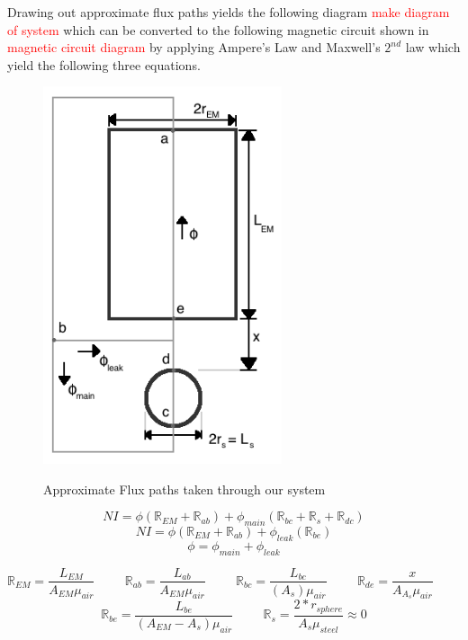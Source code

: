 \documentclass{article}
\newcommand{\xxx}[1]{\textcolor{red}{#1}}
\theoremstyle{plain}
\theoremstyle{definition}
\theoremstyle{remark}
\begin{document}
Drawing out approximate flux paths yields the following diagram \xxx{make diagram of system} which can be converted to the following magnetic circuit shown in \xxx{magnetic circuit diagram} by applying Ampere's Law and Maxwell's $2^{nd}$ law which yield the following three equations.  \\

\begin{figure}
\includegraphics[width = 7cm]{flux_diagram.png}
\label{Q1_a2}
\caption{Approximate Flux paths taken through our system}
\end{figure}

$$ NI = \phi \left (\mathbb{R}_{EM} + \mathbb{R}_{ab}\right) + \phi_{main} \left( \mathbb{R}_{bc}+\mathbb{R}_{s}+\mathbb{R}_{dc} \right) $$
$$ NI = \phi \left( \mathbb{R}_{EM} + \mathbb{R}_{ab} \right) + \phi_{leak} \left( \mathbb{R}_{be} \right) $$
$$ \phi = \phi_{main} + \phi_{leak} $$


$$ \mathbb{R}_{EM} = \frac{L_{EM}}{A_{EM}\mu_{air}}  \hspace{1cm} \mathbb{R}_{ab} = \frac{L_{ab}}{A_{EM}\mu_{air}} \hspace{1cm} \mathbb{R}_{bc} = \frac{L_{bc}}{(A_{s})\mu_{air}} \hspace{1cm} \mathbb{R}_{de} = \frac{x}{A_{A_{s}}\mu_{air}} \hspace{1cm} $$ $$ \mathbb{R}_{be} = \frac{L_{be}}{(A_{EM} - A_{s})\mu_{air}}  \hspace{1cm}  \mathbb{R}_{s} = \frac{2*r_{sphere}}{A_{s}\mu_{steel}} \approx 0$$
\end{document}
